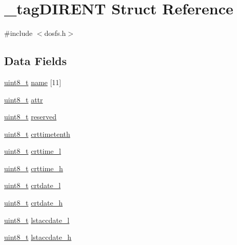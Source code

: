 \hypertarget{struct__tag_d_i_r_e_n_t}{\section{\-\_\-tag\-D\-I\-R\-E\-N\-T Struct Reference}
\label{struct__tag_d_i_r_e_n_t}
}


{\ttfamily \#include $<$dosfs.\-h$>$}

\subsection*{Data Fields}
\begin{DoxyCompactItemize}
\item 
\hyperlink{stdint_8h_aba7bc1797add20fe3efdf37ced1182c5}{uint8\-\_\-t} \hyperlink{struct__tag_d_i_r_e_n_t_a1e290f9e523fdc0530c511cfbb39b5ba}{name} \mbox{[}11\mbox{]}
\item 
\hyperlink{stdint_8h_aba7bc1797add20fe3efdf37ced1182c5}{uint8\-\_\-t} \hyperlink{struct__tag_d_i_r_e_n_t_aa7b22cac0649dc7d55ba096a9ea5aaa6}{attr}
\item 
\hyperlink{stdint_8h_aba7bc1797add20fe3efdf37ced1182c5}{uint8\-\_\-t} \hyperlink{struct__tag_d_i_r_e_n_t_a48922ac3bdc14c73bd254c19c825f10a}{reserved}
\item 
\hyperlink{stdint_8h_aba7bc1797add20fe3efdf37ced1182c5}{uint8\-\_\-t} \hyperlink{struct__tag_d_i_r_e_n_t_ad07124c900af577d6f36189dd34b1beb}{crttimetenth}
\item 
\hyperlink{stdint_8h_aba7bc1797add20fe3efdf37ced1182c5}{uint8\-\_\-t} \hyperlink{struct__tag_d_i_r_e_n_t_a56afff1057ed85e74ccbc06cd9a68748}{crttime\-\_\-l}
\item 
\hyperlink{stdint_8h_aba7bc1797add20fe3efdf37ced1182c5}{uint8\-\_\-t} \hyperlink{struct__tag_d_i_r_e_n_t_aa34dfc057de0ab0930177e59070a0d57}{crttime\-\_\-h}
\item 
\hyperlink{stdint_8h_aba7bc1797add20fe3efdf37ced1182c5}{uint8\-\_\-t} \hyperlink{struct__tag_d_i_r_e_n_t_a1985e56f435569d336f074accca04c60}{crtdate\-\_\-l}
\item 
\hyperlink{stdint_8h_aba7bc1797add20fe3efdf37ced1182c5}{uint8\-\_\-t} \hyperlink{struct__tag_d_i_r_e_n_t_acc71bf7e94fb51d36539e28d4394eb73}{crtdate\-\_\-h}
\item 
\hyperlink{stdint_8h_aba7bc1797add20fe3efdf37ced1182c5}{uint8\-\_\-t} \hyperlink{struct__tag_d_i_r_e_n_t_a075af3774af8ffe2762c67c6de406e61}{lstaccdate\-\_\-l}
\item 
\hyperlink{stdint_8h_aba7bc1797add20fe3efdf37ced1182c5}{uint8\-\_\-t} \hyperlink{struct__tag_d_i_r_e_n_t_a6218f264df8a68fa1d77f366599986e1}{lstaccdate\-\_\-h}

\end{DoxyCompactItemize}
